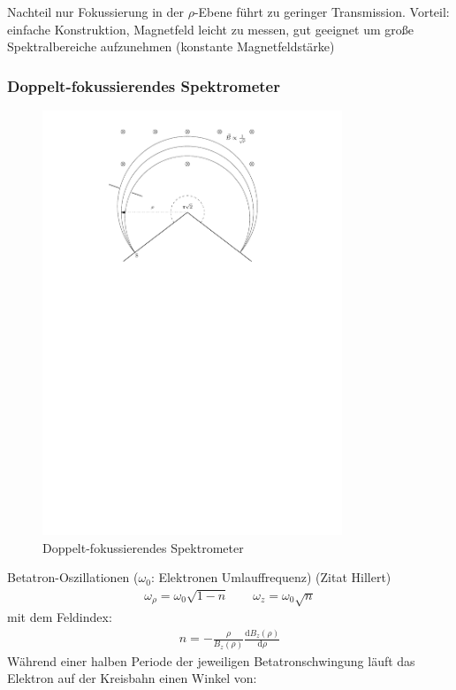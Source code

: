 \documentclass[11pt, a4paper]{article}
\numberwithin{equation}{section}
\begin{document}
Nachteil nur Fokussierung in der $\rho$-Ebene führt zu geringer Transmission.
Vorteil: einfache Konstruktion, Magnetfeld leicht zu messen, gut geeignet um große Spektralbereiche aufzunehmen (konstante Magnetfeldstärke)

\subsubsection{Doppelt-fokussierendes Spektrometer}
\begin{figure}[h]
	\centering
	\includegraphics[width=0.8\textwidth]{./figures/pisqrt2_spectrometer.pdf}
	\caption{Doppelt-fokussierendes Spektrometer}
	\label{fig:pisqrt2_spectro}
\end{figure}
Betatron-Oszillationen ($\omega_0$: Elektronen Umlauffrequenz) (Zitat Hillert)
\begin{align}
	\omega_\rho = \omega_0 \sqrt{1-n} \qquad \omega_z = \omega_0 \sqrt{n}
\end{align}
mit dem Feldindex:
\begin{align}
	n = - \frac{\rho}{B_z(\rho)} \frac{\mathrm{d} B_z(\rho)}{\mathrm{d} \rho}
\end{align}
Während einer halben Periode der jeweiligen Betatronschwingung läuft das Elektron auf der Kreisbahn einen Winkel von:
\end{document}
